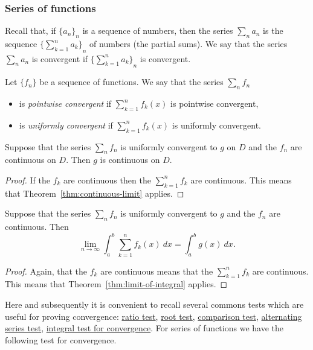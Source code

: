 \subsubsection*{Series of functions}



Recall that, if \({\{a_n\}}_{n}\) is  a sequence of numbers, then
the series \(\sum_{n}a_n\) is the sequence \({\{\sum_{k=1}^{n}a_k\}}_{n}\) of numbers (the partial sums).
We say that the series  \(\sum_{n}a_n\) is convergent if \({\{\sum_{k=1}^{n}a_k\}}_{n}\) is convergent.



\begin{definition}
  Let \(\{f_n\}\) be a sequence of functions.
  We say that the series \(\sum_{n} f_n\)
  \begin{itemize}
    \item   is \emph{pointwise convergent} if
          \(\sum_{k=1}^{n} f_k(x)\) is pointwise convergent,
    \item   is \emph{uniformly convergent} if
          \(\sum_{k=1}^{n} f_k(x)\) is uniformly convergent.
  \end{itemize}
\end{definition}


\begin{theorem}
  Suppose that the series \(\sum_{n} f_n\) is uniformly convergent to \(g\) on \(D\) and the \(f_n\) are continuous on \(D\).
  Then \(g\) is continuous on \(D\).
\end{theorem}

\begin{proof}
  If the \(f_k\) are continuous then the \(\sum_{k=1}^{n} f_k\) are continuous.
  This means that Theorem~\ref{thm:continuous-limit} applies.
\end{proof}

\begin{theorem}
  Suppose that the series \(\sum_{n} f_n\) is uniformly convergent to \(g\) and the \(f_n\) are continuous.
  Then
  \[
    \lim_{n\to\infty} \int_{a}^{b}  \sum_{k=1}^{n} f_k(x)  \ dx = \int_{a}^{b} g(x) \ dx.
  \]
\end{theorem}

\begin{proof}
  Again, that the \(f_k\) are continuous means that the \(\sum_{k=1}^{n} f_k\) are continuous.
  This means that Theorem~\ref{thm:limit-of-integral} applies.
\end{proof}

Here and subsequently it is convenient to recall several commons tests which are useful for proving convergence:
\href{https://en.wikipedia.org/wiki/Ratio_test}{ratio test},
\href{https://en.wikipedia.org/wiki/Root_test}{root test},
\href{https://en.wikipedia.org/wiki/Direct_comparison_test}{comparison test},
\href{https://en.wikipedia.org/wiki/Alternating_series_test}{alternating series test},
\href{https://en.wikipedia.org/wiki/Integral_test_for_convergence}{integral test for convergence}.
%
For series of functions we have the following test for convergence.


